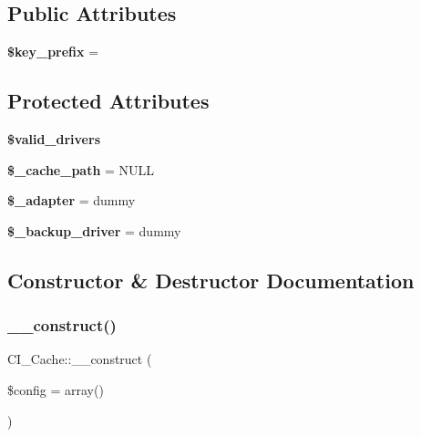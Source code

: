 \subsection*{Public Attributes}
\begin{DoxyCompactItemize}
\item 
\mbox{\label{class_c_i___cache_ac863956e86daba3af605f50867c58f28}} 
{\bfseries \$key\+\_\+prefix} = \textquotesingle{}\textquotesingle{}
\end{DoxyCompactItemize}
\subsection*{Protected Attributes}
\begin{DoxyCompactItemize}
\item 
{\bfseries \$valid\+\_\+drivers}
\item 
\mbox{\label{class_c_i___cache_aacc95986876e7f23d02c6a00c114eba9}} 
{\bfseries \$\+\_\+cache\+\_\+path} = N\+U\+LL
\item 
\mbox{\label{class_c_i___cache_ad7530eba0f0d29b7184d130b11e4f99c}} 
{\bfseries \$\+\_\+adapter} = \textquotesingle{}dummy\textquotesingle{}
\item 
\mbox{\label{class_c_i___cache_a643e768f5ee466987ff1265280bc1e74}} 
{\bfseries \$\+\_\+backup\+\_\+driver} = \textquotesingle{}dummy\textquotesingle{}
\end{DoxyCompactItemize}


\subsection{Constructor \& Destructor Documentation}
\mbox{\label{class_c_i___cache_adeccd63a6b7d3de9291862910225fe2c}} 
\subsubsection{\texorpdfstring{\+\_\+\+\_\+construct()}{\_\_construct()}}
{\footnotesize\ttfamily C\+I\+\_\+\+Cache\+::\+\_\+\+\_\+construct (\begin{DoxyParamCaption}\item[{}]{\$config = {\ttfamily array()} }\end{DoxyParamCaption})}

